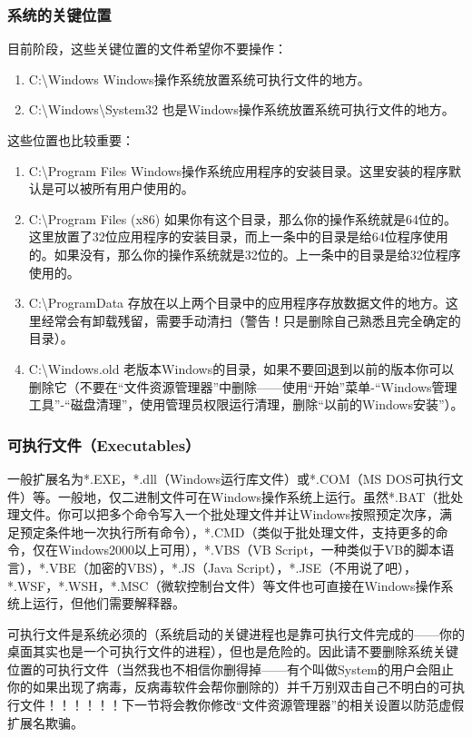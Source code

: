 \subsubsection{系统的关键位置}
目前阶段，这些关键位置的文件希望你不要操作：
\begin{enumerate}
	\item C:\textbackslash Windows  Windows操作系统放置系统可执行文件的地方。
	\item C:\textbackslash Windows\textbackslash System32  也是Windows操作系统放置系统可执行文件的地方。
\end{enumerate}\par
这些位置也比较重要：
\begin{enumerate}
	\item C:\textbackslash Program Files Windows操作系统应用程序的安装目录。这里安装的程序默认是可以被所有用户使用的。
	\item C:\textbackslash Program Files (x86) 如果你有这个目录，那么你的操作系统就是64位的。这里放置了32位应用程序的安装目录，而上一条中的目录是给64位程序使用的。如果没有，那么你的操作系统就是32位的。上一条中的目录是给32位程序使用的。
	\item C:\textbackslash ProgramData  存放在以上两个目录中的应用程序存放数据文件的地方。这里经常会有卸载残留，需要手动清扫（警告！只是删除自己熟悉且完全确定的目录）。
	\item C:\textbackslash Windows.old  老版本Windows的目录，如果不要回退到以前的版本你可以删除它（不要在“文件资源管理器”中删除——使用“开始”菜单-“Windows管理工具”-“磁盘清理”，使用管理员权限运行清理，删除“以前的Windows安装”）。
\end{enumerate}
\subsubsection{可执行文件（Executables）}
\label{sec:exe}一般扩展名为*.EXE，*.dll（Windows运行库文件）或*.COM（MS DOS可执行文件）等。一般地，仅二进制文件可在Windows操作系统上运行。虽然*.BAT（批处理文件。你可以把多个命令写入一个批处理文件并让Windows按照预定次序，满足预定条件地一次执行所有命令），*.CMD（类似于批处理文件，支持更多的命令，仅在Windows2000以上可用），*.VBS（VB Script，一种类似于VB的脚本语言），*.VBE（加密的VBS），*.JS（Java Script），*.JSE（不用说了吧），*.WSF，*.WSH，*.MSC（微软控制台文件）等文件也可直接在Windows操作系统上运行，但他们需要解释器。\par
可执行文件是系统必须的（系统启动的关键进程也是靠可执行文件完成的——你的桌面其实也是一个可执行文件的进程），但也是危险的。因此请不要删除系统关键位置的可执行文件（当然我也不相信你删得掉——有个叫做System的用户会阻止你的如果出现了病毒，反病毒软件会帮你删除的）并{\color{red}千万别双击自己不明白的可执行文件！！！！！！}下一节将会教你修改“文件资源管理器”的相关设置以防范虚假扩展名欺骗。
